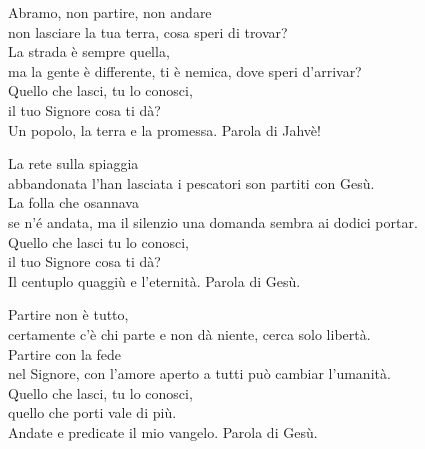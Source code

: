 

\spazio

\strofa Abramo, non partire, non andare\\
non lasciare la tua terra, cosa speri di trovar?\\
La strada è sempre quella,\\
ma la gente è differente, ti è nemica, dove speri d'arrivar?\\
Quello che lasci, tu lo conosci,\\
il tuo Signore cosa ti dà?\\
Un popolo, la terra e la promessa. Parola di Jahvè!

\spazio


\spazio

\strofa La rete sulla spiaggia\\
abbandonata l'han lasciata i pescatori son partiti con Gesù.\\
La folla che osannava\\
se n'é andata, ma il silenzio una domanda sembra ai dodici portar.\\
Quello che lasci tu lo conosci,\\
il tuo Signore cosa ti dà?\\
Il centuplo quaggiù e l'eternità. Parola di Gesù.

\spazio


\spazio

\strofa Partire non è tutto,\\
certamente c'è chi parte e non dà niente, cerca solo libertà.\\
Partire con la fede\\
nel Signore, con l'amore aperto a tutti può cambiar l'umanità.\\
Quello che lasci, tu lo conosci,\\
quello che porti vale di più.\\
Andate e predicate il mio vangelo. Parola di Gesù.

\spazio

